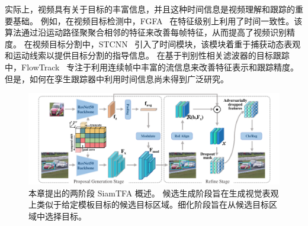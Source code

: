 实际上，视频具有关于目标的丰富信息，并且这种时间信息是视频理解和跟踪的重要基础。
例如，在视频目标检测中，FGFA~\cite{zhu2017flow} 在特征级别上利用了时间一致性。该算法通过沿运动路径聚聚合相邻的特征来改善每帧特征，从而提高了视频识别精度。
在视频目标分割中，STCNN~\cite{xu2019spatiotemporal} 引入了时间模块，该模块着重于捕获动态表观和运动线索以提供目标分割的指导信息。
在基于判别性相关滤波器的目标跟踪中，FlowTrack~\cite{zhu2018end} 专注于利用连续帧中丰富的流信息来改善特征表示和跟踪精度。
但是，如何在孪生跟踪器中利用时间信息尚未得到广泛研究。

\begin{figure}[t]
    \centering
    \includegraphics[width=1.0\textwidth]{Img/end/net_v3.pdf}
    \caption{
    本章提出的两阶段 SiamTFA 概述。
    候选生成阶段旨在生成视觉表观上类似于给定模板目标的候选目标区域。细化阶段旨在从候选目标区域中选择目标。}
    \label{fig:SiamTFA}
\end{figure}

